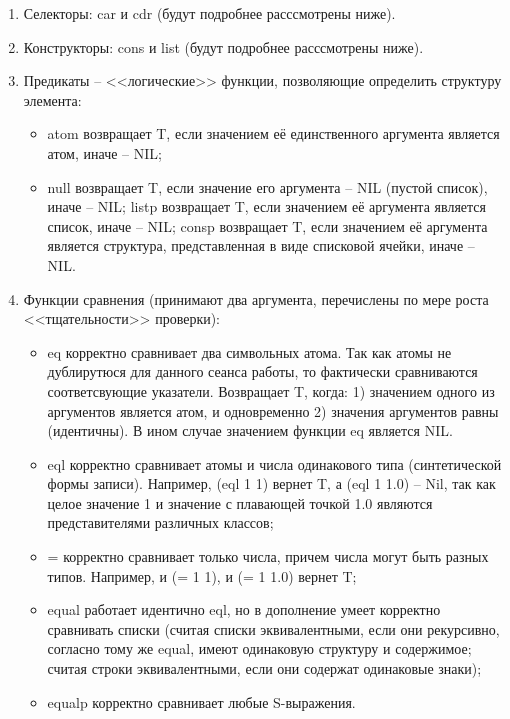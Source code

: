 \documentclass[12pt]{report}
\begin{document}
\begin{enumerate}
	\item Селекторы: car и cdr (будут подробнее расссмотрены ниже).
	\item Конструкторы: cons и list (будут подробнее расссмотрены ниже).
	\item Предикаты -- <<логические>> функции, позволяющие определить структуру элемента:
	\begin{itemize}
		\item atom возвращает T, если значением её единственного аргумента является атом, иначе -- NIL;
		\item null возвращает T, если значение его аргумента -- NIL (пустой список), иначе -- NIL;
		listp возвращает T, если значением её аргумента является список, иначе -- NIL;
		consp возвращает T, если значением её аргумента является структура, представленная в виде списковой ячейки, иначе -- NIL. 
	\end{itemize}
	\item Функции сравнения (принимают два аргумента, перечислены по мере роста <<тщательности>> проверки):
	\begin{itemize}
		\item eq корректно сравнивает два символьных атома. Так как атомы не дублирутюся для данного сеанса работы, то фактически сравниваются соответсвующие указатели. 
		Возвращает T, когда: 1) значением одного из аргументов является атом, и одновременно 2) значения аргументов равны (идентичны). В ином случае значением функции eq является NIL. 
		\item eql корректно сравнивает атомы и числа одинакового типа (синтетической формы записи). Например, (eql 1 1) вернет T, а (eql 1 1.0) -- Nil, так как целое значение 1 и значение с плавающей точкой 1.0 являются представителями различных классов;
		\item = корректно сравнивает только числа, причем числа могут быть разных типов. Например, и (= 1 1), и (= 1 1.0) вернет T;
		\item equal работает идентично eql, но в дополнение умеет корректно сравнивать списки (считая списки эквивалентными, если они рекурсивно, согласно тому же equal, имеют одинаковую структуру и содержимое; считая строки эквивалентными, если они содержат одинаковые знаки);
		\item equalp корректно сравнивает любые S-выражения. 
	\end{itemize}
\end{enumerate}
	
\end{document}
